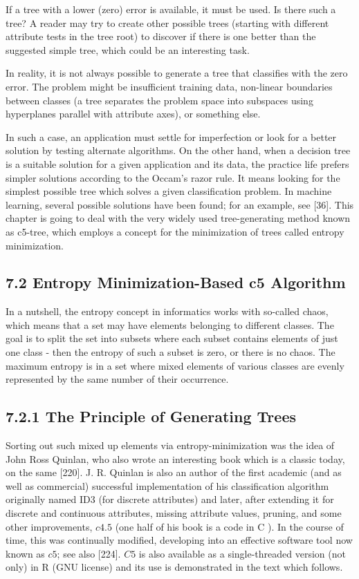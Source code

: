 \documentclass[10pt]{book}
\begin{document}
If a tree with a lower (zero) error is available, it must be used. Is there such a tree? A reader may try to create other possible trees (starting with different attribute tests in the tree root) to discover if there is one better than the suggested simple tree, which could be an interesting task.

In reality, it is not always possible to generate a tree that classifies with the zero error. The problem might be insufficient training data, non-linear boundaries between classes (a tree separates the problem space into subspaces using hyperplanes parallel with attribute axes), or something else.

In such a case, an application must settle for imperfection or look for a better solution by testing alternate algorithms. On the other hand, when a decision tree is a suitable solution for a given application and its data, the practice life prefers simpler solutions according to the Occam's razor rule. It means looking for the simplest possible tree which solves a given classification problem. In machine learning, several possible solutions have been found; for an example, see [36]. This chapter is going to deal with the very widely used tree-generating method known as c5-tree, which employs a concept for the minimization of trees called entropy minimization.

\subsection*{7.2 Entropy Minimization-Based $\boldsymbol{c} \mathbf{5}$ Algorithm}
In a nutshell, the entropy concept in informatics works with so-called chaos, which means that a set may have elements belonging to different classes. The goal is to split the set into subsets where each subset contains elements of just one class - then the entropy of such a subset is zero, or there is no chaos. The maximum entropy is in a set where mixed elements of various classes are evenly represented by the same number of their occurrence.

\subsection*{7.2.1 The Principle of Generating Trees}
Sorting out such mixed up elements via entropy-minimization was the idea of John Ross Quinlan, who also wrote an interesting book which is a classic today, on the same [220]. J. R. Quinlan is also an author of the first academic (and as well as commercial) successful implementation of his classification algorithm originally named ID3 (for discrete attributes) and later, after extending it for discrete and continuous attributes, missing attribute values, pruning, and some\\
other improvements, $c 4.5$ (one half of his book is a code in C ). In the course of time, this was continually modified, developing into an effective software tool now known as $c 5$; see also [224]. $C 5$ is also available as a single-threaded version (not only) in R (GNU license) and its use is demonstrated in the text which follows.
\end{document}
